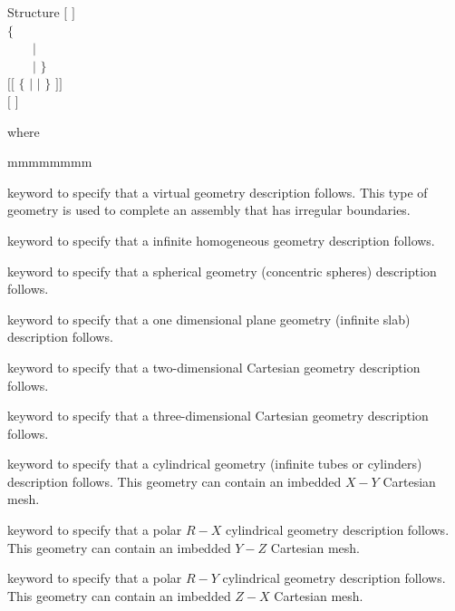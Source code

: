 \begin{DataStructure}{Structure }
$[$   $]$ \\
$\{$    \\
~~~~$|$  \\
~~~~$|$  $\}$ \\
$[[$ \moc{:::}  \moc{:=}  $\{$  $|$
 $|$
 $\}$  $]]$ \\
$[$  $]$ \\
\moc{;} 
\end{DataStructure}

\noindent
where

\begin{ListeDeDescription}{mmmmmmmm}

\item[\moc{VIRTUAL}] keyword to specify that a virtual geometry description
follows. This type of geometry is used to complete an assembly that has
irregular boundaries.

\item[\moc{HOMOGE}] keyword to specify that a infinite homogeneous geometry
description follows.

\item[\moc{SPHERE}] keyword to specify that a spherical geometry  (concentric
spheres) description follows.

\item[\moc{CAR1D}] keyword to specify that a one dimensional plane geometry
(infinite slab) description follows.

\item[\moc{CAR2D}] keyword to specify that a two-dimensional Cartesian
geometry description follows.

\item[\moc{CAR3D}] keyword to specify that a three-dimensional Cartesian
geometry description follows.

\item[\moc{TUBE}] keyword to specify that a cylindrical geometry (infinite
tubes or cylinders) description follows. This geometry can contain an imbedded $X-Y$ Cartesian mesh.

\item[\moc{TUBEX}] keyword to specify that a polar $R-X$ cylindrical geometry
description follows. This geometry can contain an imbedded $Y-Z$ Cartesian mesh.

\item[\moc{TUBEY}] keyword to specify that a polar $R-Y$ cylindrical geometry
description follows. This geometry can contain an imbedded $Z-X$ Cartesian mesh.


\end{ListeDeDescription}
